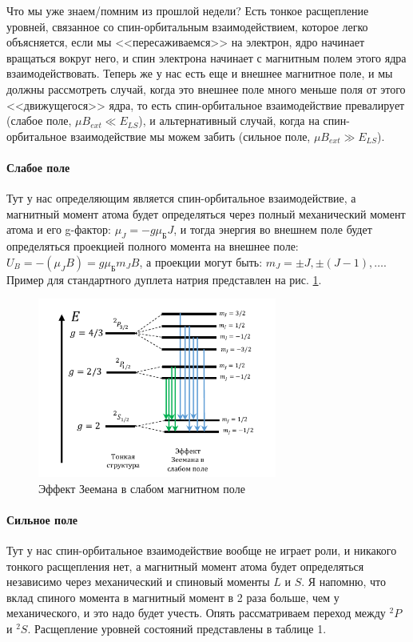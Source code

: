 \documentclass[12pt]{article}
\begin{document}
Что мы уже знаем/помним из прошлой недели? Есть тонкое расщепление уровней, связанное со спин-орбитальным взаимодействием, которое легко объясняется, если мы <<пересаживаемся>> на электрон, ядро начинает вращаться вокруг него, и спин электрона начинает с магнитным полем этого ядра взаимодействовать. Теперь же у нас есть еще и внешнее магнитное поле, и мы должны рассмотреть случай, когда это внешнее поле много меньше поля от этого <<движущегося>> ядра, то есть спин-орбитальное взаимодействие превалирует (слабое поле, $\mu B_{ext} \ll E_{LS}$), и альтернативный случай, когда на спин-орбитальное взаимодействие мы можем забить (сильное поле, $\mu B_{ext} \gg E_{LS}$).

\paragraph{Слабое поле} Тут у нас определяющим является спин-орбитальное взаимодействие, а магнитный момент атома будет определяться через полный механический момент атома и его g-фактор: $\mu_J = -g\mu_{\text{Б}}J$, и тогда энергия во внешнем поле будет определяться проекцией полного момента на внешнее поле: $U_B = -(\mu_J B) = g\mu_{\text{Б}}m_JB$, а проекции могут быть: $m_J = \pm J, \pm (J-1), \dots$. Пример для стандартного дуплета натрия представлен на рис. \ref{fig:sem_08_weak_zeeman}.

\begin{figure}[h!]
    \centering
    \includegraphics[width=0.7\textwidth,height=\textheight,keepaspectratio]{Seminar_08/pics/pic_03.pdf}
    \caption{Эффект Зеемана в слабом магнитном поле}
    \label{fig:sem_08_weak_zeeman}
\end{figure}

\paragraph{Сильное поле} Тут у нас спин-орбитальное взаимодействие вообще не играет роли, и никакого тонкого расщепления нет, а магнитный момент атома будет определяться независимо через механический и спиновый моменты $L$ и $S$. Я напомню, что вклад спиного момента в магнитный момент в 2 раза больше, чем у механического, и это надо будет учесть. Опять рассматриваем переход между $^2P$ и $^2S$. Расщепление уровней состояний представлены в таблице 1.
\end{document}
